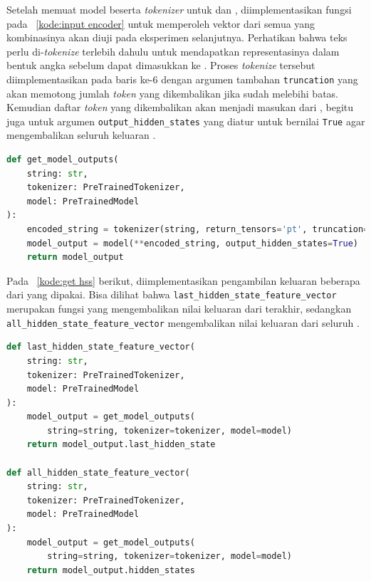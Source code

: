 Setelah memuat model beserta \textit{tokenizer} untuk \bert{} dan \tfive{}, diimplementasikan fungsi pada \kode{}~\ref{kode:input encoder} untuk memperoleh vektor dari semua \hs{} yang kombinasinya akan diuji pada eksperimen selanjutnya. Perhatikan bahwa teks perlu di-\textit{tokenize} terlebih dahulu untuk mendapatkan representasinya dalam bentuk angka sebelum dapat dimasukkan ke \encoder{}. Proses \textit{tokenize} tersebut diimplementasikan pada baris ke-6 dengan argumen tambahan \lstinline{truncation} yang akan memotong jumlah \textit{token} yang dikembalikan jika sudah melebihi batas. Kemudian daftar \textit{token} yang dikembalikan akan menjadi masukan dari \encoder{}, begitu juga untuk argumen \lstinline{output_hidden_states} yang diatur untuk bernilai \lstinline{True} agar \encoder{} mengembalikan seluruh keluaran \hs{}.

\begin{lstlisting}[language=Python, caption={Fungsi mendapatkan keluaran dari \encoder{}}, label={kode:input encoder}]
def get_model_outputs(
    string: str,
    tokenizer: PreTrainedTokenizer,
    model: PreTrainedModel
):
    encoded_string = tokenizer(string, return_tensors='pt', truncation=True)
    model_output = model(**encoded_string, output_hidden_states=True)
    return model_output
\end{lstlisting}


Pada \kode{}~\ref{kode:get hss} berikut, diimplementasikan pengambilan keluaran beberapa  dari \encoder{} yang dipakai. Bisa dilihat bahwa \lstinline{last_hidden_state_feature_vector} merupakan fungsi yang mengembalikan nilai keluaran dari \hs{} terakhir, sedangkan \lstinline{all_hidden_state_feature_vector}  mengembalikan nilai keluaran dari seluruh .
\begin{lstlisting}[language=Python, caption={Fungsi pengambilan \hs{}}, label={kode:get hss}]
def last_hidden_state_feature_vector(
    string: str,
    tokenizer: PreTrainedTokenizer,
    model: PreTrainedModel
):
    model_output = get_model_outputs(
        string=string, tokenizer=tokenizer, model=model)
    return model_output.last_hidden_state

def all_hidden_state_feature_vector(
    string: str,
    tokenizer: PreTrainedTokenizer,
    model: PreTrainedModel
):
    model_output = get_model_outputs(
        string=string, tokenizer=tokenizer, model=model)
    return model_output.hidden_states
\end{lstlisting}


